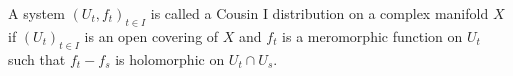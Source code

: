 A system $(U_t, f_t)_{t \in I}$ is called a Cousin I distribution on a complex manifold $X$ if $(U_t)_{t \in I}$ is an open covering of $X$ and $f_t$ is a meromorphic function on $U_t$ such that $f_t - f_s$ is holomorphic on $U_t \cap U_s$.
